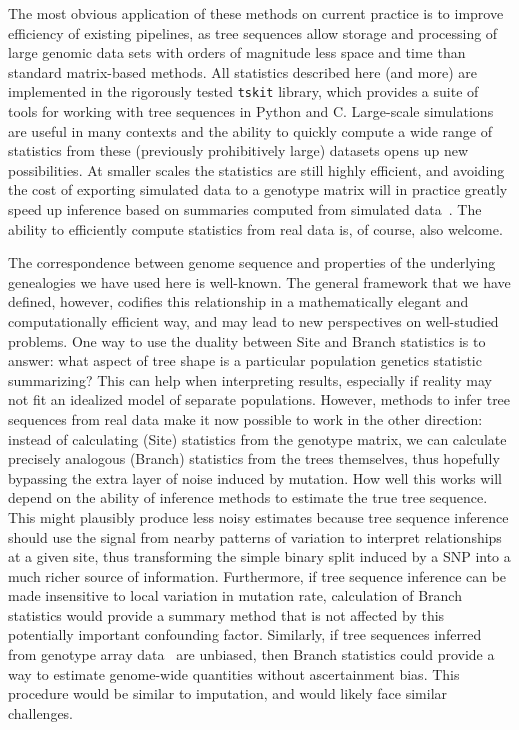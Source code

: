 \documentclass{article}
\newcommand{\tskit}{{\texttt{tskit}}}
\begin{document}
The most obvious application of these methods on current practice
is to improve efficiency of existing pipelines,
as tree sequences allow storage and processing of large genomic data sets
with orders of magnitude less space and time than standard matrix-based methods.
All statistics described here (and more) are implemented
in the rigorously tested \tskit{} library,
which provides a suite of tools for working with tree sequences in Python and C.
Large-scale simulations are useful in many contexts
\citep[e.g.,][]{martin2017human,browning2018one,galloway2019stickleback}
and the ability to quickly compute a wide range of statistics from
these (previously prohibitively large) datasets opens up new possibilities.
At smaller scales the statistics are still highly efficient, and avoiding
the cost of exporting simulated data to a genotype matrix will in practice greatly
speed up inference based on summaries computed from simulated
data~\citep{beaumont2002approximate,csillery2010approximate,schrider2018supervised}.
The ability to efficiently compute statistics from real data is, of course, also welcome.

The correspondence between genome sequence and properties of the
underlying genealogies we have used here is well-known. The general framework
that we have defined, however, codifies this relationship in a
mathematically elegant and computationally efficient way, and may lead to
new perspectives on well-studied problems.
One way to use the duality between Site and Branch statistics is to answer:
what aspect of tree shape is a particular population genetics statistic summarizing?
This can help when interpreting results, especially if reality may not fit an idealized model
of separate populations.
However, methods to infer tree sequences from real data
make it now possible to work in the other direction:
instead of calculating (Site) statistics from the genotype matrix,
we can calculate precisely analogous (Branch) statistics from the trees themselves,
thus hopefully bypassing the extra layer of noise induced by mutation.
How well this works will depend on the ability of inference methods
to estimate the true tree sequence.
This might plausibly produce less noisy estimates because tree sequence inference
should use the signal from nearby patterns of variation
to interpret relationships at a given site,
thus transforming the simple binary split induced by a SNP
into a much richer source of information.
Furthermore,
if tree sequence inference can be made insensitive to local variation in mutation rate,
calculation of Branch statistics would provide a summary method
that is not affected by this potentially important confounding factor.
Similarly, if tree sequences inferred from
genotype array data~\citep{kelleher2019inferring} are unbiased,
then Branch statistics could provide a way
to estimate genome-wide quantities without ascertainment bias.
This procedure would be similar to imputation, and would likely face similar challenges.
\end{document}
